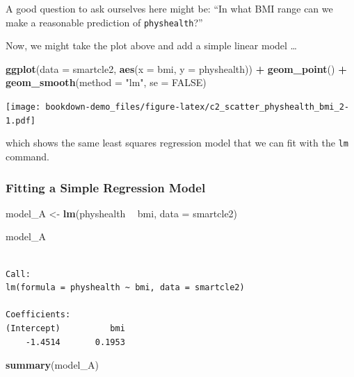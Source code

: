 \documentclass[]{book}
\newenvironment{Shaded}{\begin{snugshade}}{\end{snugshade}}
\newcommand{\KeywordTok}[1]{\textcolor[rgb]{0.13,0.29,0.53}{\textbf{#1}}}
\newcommand{\DataTypeTok}[1]{\textcolor[rgb]{0.13,0.29,0.53}{#1}}
\newcommand{\StringTok}[1]{\textcolor[rgb]{0.31,0.60,0.02}{#1}}
\newcommand{\OtherTok}[1]{\textcolor[rgb]{0.56,0.35,0.01}{#1}}
\newcommand{\OperatorTok}[1]{\textcolor[rgb]{0.81,0.36,0.00}{\textbf{#1}}}
\newcommand{\NormalTok}[1]{#1}
\theoremstyle{definition}
\theoremstyle{definition}
\theoremstyle{definition}
\theoremstyle{remark}
\begin{document}
A good question to ask ourselves here might be: ``In what BMI range can
we make a reasonable prediction of \texttt{physhealth}?''

Now, we might take the plot above and add a simple linear model \ldots{}

\begin{Shaded}
\begin{Highlighting}[]
\KeywordTok{ggplot}\NormalTok{(}\DataTypeTok{data =}\NormalTok{ smartcle2, }\KeywordTok{aes}\NormalTok{(}\DataTypeTok{x =}\NormalTok{ bmi, }\DataTypeTok{y =}\NormalTok{ physhealth)) }\OperatorTok{+}
\StringTok{    }\KeywordTok{geom_point}\NormalTok{() }\OperatorTok{+}
\StringTok{    }\KeywordTok{geom_smooth}\NormalTok{(}\DataTypeTok{method =} \StringTok{"lm"}\NormalTok{, }\DataTypeTok{se =} \OtherTok{FALSE}\NormalTok{)}
\end{Highlighting}
\end{Shaded}

\texttt{[image: bookdown-demo\_files/figure-latex/c2\_scatter\_physhealth\_bmi\_2-1.pdf]}

which shows the same least squares regression model that we can fit with
the \texttt{lm} command.

\subsubsection{Fitting a Simple Regression
Model}\label{fitting-a-simple-regression-model}

\begin{Shaded}
\begin{Highlighting}[]
\NormalTok{model_A <-}\StringTok{ }\KeywordTok{lm}\NormalTok{(physhealth }\OperatorTok{~}\StringTok{ }\NormalTok{bmi, }\DataTypeTok{data =}\NormalTok{ smartcle2)}

\NormalTok{model_A}
\end{Highlighting}
\end{Shaded}

\begin{verbatim}

Call:
lm(formula = physhealth ~ bmi, data = smartcle2)

Coefficients:
(Intercept)          bmi  
    -1.4514       0.1953  
\end{verbatim}

\begin{Shaded}
\begin{Highlighting}[]
\KeywordTok{summary}\NormalTok{(model_A)}
\end{Highlighting}
\end{Shaded}
\end{document}
